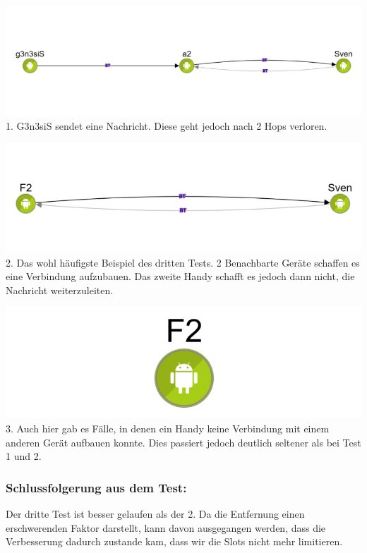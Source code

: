 \includegraphics[width=1.0\textwidth]{belege/grosstests/Bilder/Grosstest2/Test3Misserfolg1.jpg}
1. G3n3siS sendet eine Nachricht. Diese geht jedoch nach 2 Hops verloren.

\includegraphics[width=1.0\textwidth]{belege/grosstests/Bilder/Grosstest2/Test3Misserfolg2.jpg}
2. Das wohl häufigste Beispiel des dritten Tests. 2 Benachbarte Geräte
schaffen es eine Verbindung aufzubauen. Das zweite Handy schafft es
jedoch dann nicht, die Nachricht weiterzuleiten.


\includegraphics[width=1.0\textwidth]{belege/grosstests/Bilder/Grosstest2/Test3Misserfolg3.jpg}
3. Auch hier gab es Fälle, in denen ein Handy keine Verbindung mit einem anderen Gerät aufbauen konnte. Dies passiert jedoch deutlich seltener als bei Test 1 und 2. 
\subsubsection{Schlussfolgerung aus dem
Test:}\label{schlussfolgerung-aus-dem-test-4}

Der dritte Test ist besser gelaufen als der 2. Da die Entfernung einen
erschwerenden Faktor darstellt, kann davon ausgegangen werden, dass die
Verbesserung dadurch zustande kam, dass wir die Slots nicht mehr
limitieren.

